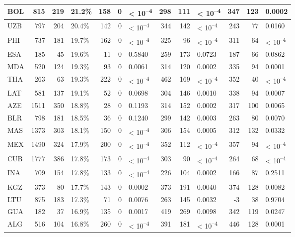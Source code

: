 \begin{tabular}{l|r|r|l|r|r|l|r|r|l|r|r|l}
\hline
BOL & 815 & 219 & 21.2\% & 158 & 0 & < 10\textsuperscript{--4} & 298 & 111 & < 10\textsuperscript{--4} & 347 & 123 & 0.0002\\
\hline
UZB & 797 & 204 & 20.4\% & 142 & 0 & < 10\textsuperscript{--4} & 344 & 142 & < 10\textsuperscript{--4} & 243 & 77 & 0.0160\\
\hline
PHI & 737 & 181 & 19.7\% & 162 & 0 & < 10\textsuperscript{--4} & 325 & 96 & < 10\textsuperscript{--4} & 311 & 64 & < 10\textsuperscript{--4}\\
\hline
ESA & 185 & 45 & 19.6\% & -11 & 0 & 0.5840 & 259 & 173 & 0.0723 & 187 & 66 & 0.0862\\
\hline
MDA & 520 & 124 & 19.3\% & 93 & 0 & 0.0061 & 314 & 120 & 0.0002 & 335 & 94 & 0.0001\\
\hline
THA & 263 & 63 & 19.3\% & 222 & 0 & < 10\textsuperscript{--4} & 462 & 169 & < 10\textsuperscript{--4} & 352 & 40 & < 10\textsuperscript{--4}\\
\hline
LAT & 581 & 137 & 19.1\% & 52 & 0 & 0.0698 & 304 & 146 & 0.0010 & 338 & 94 & 0.0007\\
\hline
AZE & 1511 & 350 & 18.8\% & 28 & 0 & 0.1193 & 314 & 152 & 0.0002 & 317 & 100 & 0.0065\\
\hline
BLR & 798 & 181 & 18.5\% & 36 & 0 & 0.1240 & 299 & 142 & 0.0003 & 263 & 80 & 0.0070\\
\hline
MAS & 1373 & 303 & 18.1\% & 150 & 0 & < 10\textsuperscript{--4} & 306 & 154 & 0.0005 & 312 & 132 & 0.0332\\
\hline
MEX & 1490 & 324 & 17.9\% & 200 & 0 & < 10\textsuperscript{--4} & 352 & 112 & < 10\textsuperscript{--4} & 357 & 94 & < 10\textsuperscript{--4}\\
\hline
CUB & 1777 & 386 & 17.8\% & 173 & 0 & < 10\textsuperscript{--4} & 303 & 90 & < 10\textsuperscript{--4} & 264 & 68 & < 10\textsuperscript{--4}\\
\hline
INA & 709 & 154 & 17.8\% & 133 & 0 & < 10\textsuperscript{--4} & 226 & 104 & 0.0002 & 166 & 87 & 0.2511\\
\hline
KGZ & 373 & 80 & 17.7\% & 143 & 0 & 0.0002 & 373 & 191 & 0.0040 & 374 & 128 & 0.0082\\
\hline
LTU & 875 & 183 & 17.3\% & 71 & 0 & 0.0076 & 263 & 145 & 0.0032 & -3 & 38 & 0.9704\\
\hline
GUA & 182 & 37 & 16.9\% & 135 & 0 & 0.0017 & 419 & 269 & 0.0098 & 342 & 119 & 0.0247\\
\hline
ALG & 516 & 104 & 16.8\% & 260 & 0 & < 10\textsuperscript{--4} & 391 & 181 & < 10\textsuperscript{--4} & 446 & 128 & 0.0001\\

\end{tabular}
